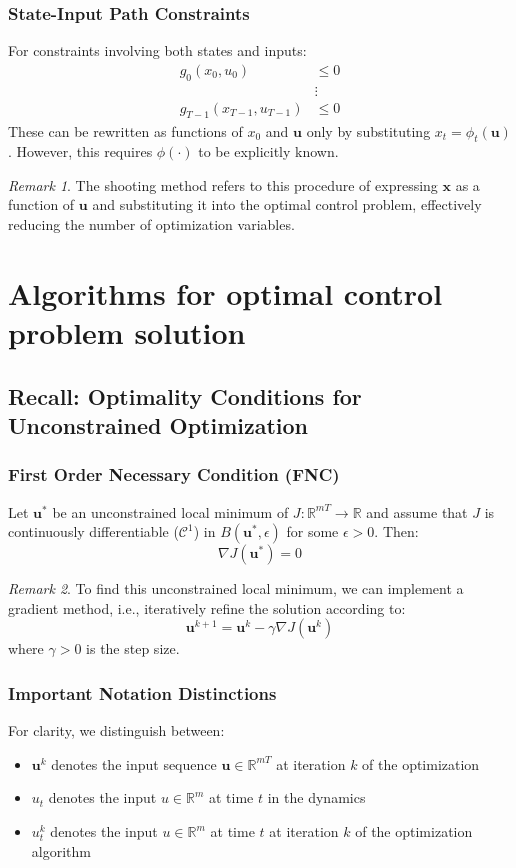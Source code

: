 \documentclass[openany]{book}
\theoremstyle{definition}
\theoremstyle{remark}
\newtheorem*{remark}{Remark}
\begin{document}
\subsubsection{State-Input Path Constraints}
For constraints involving both states and inputs:
\begin{align*}
    g_0(x_0,u_0) &\leq 0\\
    &\vdots \\
    g_{T-1}(x_{T-1},u_{T-1}) &\leq 0
\end{align*}
These can be rewritten as functions of $x_0$ and $\mathbf{u}$ only by substituting $x_t = \phi_t(\mathbf{u})$. However, this requires $\phi(\cdot)$ to be explicitly known.

\begin{remark}
The shooting method refers to this procedure of expressing $\mathbf{x}$ as a function of $\mathbf{u}$ and substituting it into the optimal control problem, effectively reducing the number of optimization variables.
\end{remark}

\section{Algorithms for optimal control problem solution}

\subsection{Recall: Optimality Conditions for Unconstrained Optimization}

\subsubsection{First Order Necessary Condition (FNC)}
Let $\mathbf{u}^*$ be an unconstrained local minimum of $J: \mathbb{R}^{mT} \to \mathbb{R}$ and assume that $J$ is continuously differentiable ($\mathcal{C}^1$) in $B(\mathbf{u}^*, \epsilon)$ for some $\epsilon > 0$. Then:
\[
    \nabla J(\mathbf{u}^*) = 0
\]

\begin{remark}
To find this unconstrained local minimum, we can implement a gradient method, i.e., iteratively refine the solution according to:
\[
    \mathbf{u}^{k+1} = \mathbf{u}^k - \gamma\nabla J(\mathbf{u}^k)
\]
where $\gamma > 0$ is the step size.
\end{remark}

\subsubsection{Important Notation Distinctions}
For clarity, we distinguish between:
\begin{itemize}
    \item $\mathbf{u}^k$ denotes the input sequence $\mathbf{u} \in \mathbb{R}^{mT}$ at iteration $k$ of the optimization
    \item $u_t$ denotes the input $u \in \mathbb{R}^m$ at time $t$ in the dynamics
    \item $u_t^k$ denotes the input $u \in \mathbb{R}^m$ at time $t$ at iteration $k$ of the optimization algorithm
\end{itemize}
\end{document}
